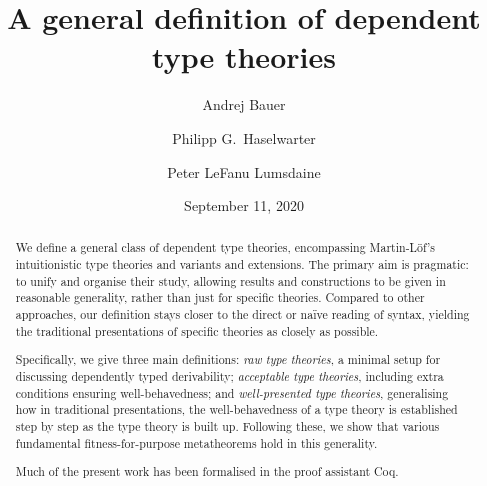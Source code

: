 \documentclass[12pt]{article}
\begin{document}
\title{A general definition of dependent type theories}

\author{Andrej Bauer
  \and Philipp G.~Haselwarter
  \and Peter LeFanu Lumsdaine}

\date{September 11, 2020}

\maketitle



\begin{abstract}
  We define a general class of dependent type theories, encompassing Martin-Löf’s intuitionistic type theories and variants and extensions.
  The primary aim is pragmatic: to unify and organise their study, allowing results and constructions to be given in reasonable generality, rather than just for specific theories.
  Compared to other approaches, our definition stays closer to the direct or naïve reading of syntax, yielding the traditional presentations of specific theories as closely as possible.
  
  Specifically, we give three main definitions: \emph{raw type theories}, a minimal setup for discussing dependently typed derivability; \emph{acceptable type theories}, including extra conditions ensuring well-behavedness; and \emph{well-presented type theories}, generalising how in traditional presentations, the well-behavedness of a type theory is established step by step as the type theory is built up.
  Following these, we show that various fundamental fitness-for-purpose metatheorems hold in this generality.

  Much of the present work has been formalised in the proof assistant Coq.
\end{abstract}

\newpage
\tableofcontents
\newpage

\newpage












\appendix


% 
\end{document}
